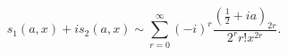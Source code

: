 \[s_{1}(a,x)+is_{2}(a,x)\sim\sum_{r=0}^{\infty}(-i)^{r}\frac{\left(\tfrac{1}{2}+%
ia\right)_{2r}}{2^{r}r!x^{2r}}.\]